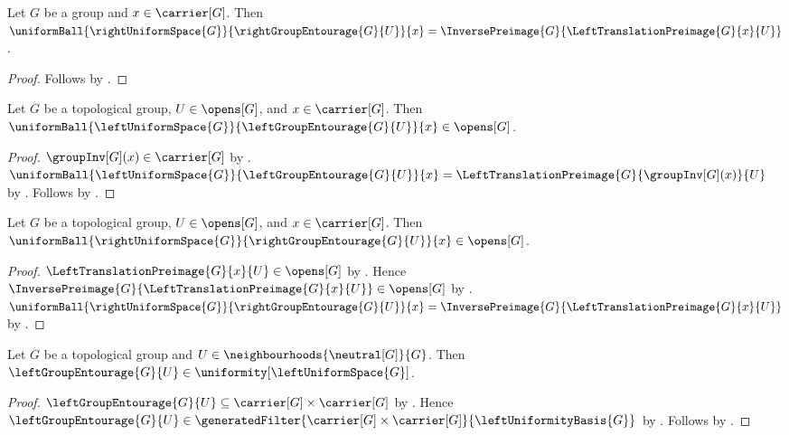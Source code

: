 \begin{proposition}\label{right_group_entourage_ball}
    Let $G$ be a group and $x\in\carrier[G]$.
    Then $\uniformBall{\rightUniformSpace{G}}
        {\rightGroupEntourage{G}{U}}{x}
        =\InversePreimage{G}{\LeftTranslationPreimage{G}{x}{U}}$.
\end{proposition}
\begin{proof}
    Follows by
        .
\end{proof}

\begin{proposition}\label{left_group_basic_ball_open}
    Let $G$ be a topological group, $U\in\opens[G]$, and
        $x\in\carrier[G]$.
    Then $\uniformBall{\leftUniformSpace{G}}
        {\leftGroupEntourage{G}{U}}{x}\in\opens[G]$.
\end{proposition}
\begin{proof}
    $\groupInv[G](x)\in\carrier[G]$ by .
    $\uniformBall{\leftUniformSpace{G}}
        {\leftGroupEntourage{G}{U}}{x}
        =\LeftTranslationPreimage{G}{\groupInv[G](x)}{U}$
        by .
    Follows by .
\end{proof}

\begin{proposition}\label{right_group_basic_ball_open}
    Let $G$ be a topological group, $U\in\opens[G]$, and
        $x\in\carrier[G]$.
    Then $\uniformBall{\rightUniformSpace{G}}
        {\rightGroupEntourage{G}{U}}{x}\in\opens[G]$.
\end{proposition}
\begin{proof}
    $\LeftTranslationPreimage{G}{x}{U}\in\opens[G]$
        by .
    Hence $\InversePreimage{G}{\LeftTranslationPreimage{G}{x}{U}}
        \in\opens[G]$ by .
    $\uniformBall{\rightUniformSpace{G}}
        {\rightGroupEntourage{G}{U}}{x}
        =\InversePreimage{G}{\LeftTranslationPreimage{G}{x}{U}}$
        by .
\end{proof}

\begin{proposition}\label{left_group_basic_entourage_is_entourage}
    Let $G$ be a topological group and
        $U\in\neighbourhoods{\neutral[G]}{G}$.
    Then $\leftGroupEntourage{G}{U}
        \in\uniformity[\leftUniformSpace{G}]$.
\end{proposition}
\begin{proof}
    $\leftGroupEntourage{G}{U}
        \subseteq\carrier[G]\times\carrier[G]$
        by .
    Hence $\leftGroupEntourage{G}{U}\in\generatedFilter
        {\carrier[G]\times\carrier[G]}{\leftUniformityBasis{G}}$
        by .
    Follows by .
\end{proof}

